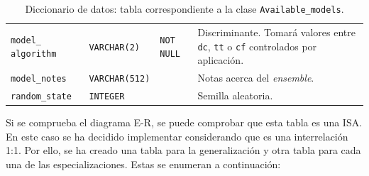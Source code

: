 \begin{table}
{\begin{tabular}{@{}p{6em} p{6em} p{5em} p{20em}@{}}
			\texttt{model\_ algorithm} & \texttt{VARCHAR(2)} & \texttt{NOT NULL} & Discriminante. Tomará valores entre \texttt{dc}, \texttt{tt} o \texttt{cf} controlados por aplicación.\\
			\texttt{model\_notes} & \texttt{VARCHAR(512)} & & Notas acerca del \textit{ensemble}.\\
			\texttt{random\_state} & \texttt{INTEGER} & & Semilla aleatoria.  \\
			\bottomrule
		\end{tabular}
	}
	\caption[Diccionario de datos: \texttt{Available\_models}]{Diccionario de datos: tabla correspondiente a la clase \texttt{Available\_models}.}
	\label{datadic:models}
\end{table}

Si se comprueba el diagrama E-R, se puede comprobar que esta tabla es una ISA. En este caso se ha decidido implementar considerando que es una interrelación 1:1. Por ello, se ha creado una tabla para la generalización y otra tabla para cada una de las especializaciones. Estas se enumeran a continuación:

